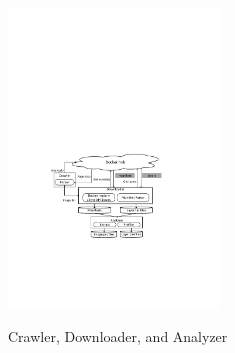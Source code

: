 
\begin{figure}
	\centering
	\includegraphics[width=0.5\textwidth]{graphs/fig-downloader-analyzer.pdf}\\
	\caption{Crawler, Downloader, and Analyzer
	}
	\label{fig-downloader-analyzer}
\end{figure}
